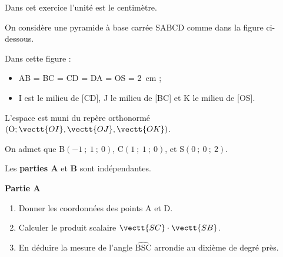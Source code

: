 Dans cet exercice l'unité est le centimètre.

On considère une pyramide à base carrée SABCD comme dans la figure ci-dessous.

\begin{center}
\end{center}
















Dans cette figure :

\begin{itemize}
\item AB = BC = CD = DA = OS = 2~cm ;
\item I est le milieu de [CD], J le milieu de [BC] et K le milieu de [OS].
\end{itemize}

L'espace est muni du repère orthonormé $\left(\mathrm{O}; \vectt{OI}, \vectt{OJ}, \vectt{OK}\right)$.

On admet que B$(-1~;~1~;~0)$, C$(1~;~1~;~0)$, et S$(0~;~0~;~2)$.

\medskip

Les \textbf{parties A} et \textbf{B} sont indépendantes.

\textbf{Partie A}

\begin{enumerate}
\item Donner les coordonnées des points A et D.
\item Calculer le produit scalaire $\vectt{SC}\cdot\vectt{SB}$.
\item En déduire la mesure de l'angle $\widehat{\mathrm{BSC}}$ arrondie au dixième de degré près.
\end{enumerate}

